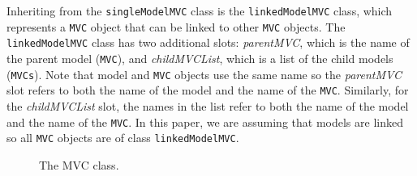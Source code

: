 \documentclass{article}[11pt]
\newcommand{\Robject}[1]{{\texttt{#1}}}
\newcommand{\Rslot}[1]{\textsl{#1}}
\newcommand{\Rclass}[1]{\texttt{#1}}
\begin{document}
Inheriting from the \Rclass{singleModelMVC} class is the
\Rclass{linkedModelMVC} class, which represents a \Robject{MVC} object that
can be linked to other \Robject{MVC} objects.  The \Rclass{linkedModelMVC}
class has two additional slots: \Rslot{parentMVC}, which is the name of the
parent model (\Robject{MVC}), and \Rslot{childMVCList}, which is a list of the
child models (\Robject{MVCs}).  Note that model and
\Robject{MVC} objects use the same name so the \Rslot{parentMVC} slot refers
to both the name of the model and the name of the \Robject{MVC}.
Similarly, for the \Rslot{childMVCList} slot, the names in the list refer to
both the name of the model and the name of the \Robject{MVC}.  In this paper,
we are assuming that models are linked so all \Robject{MVC} objects are of
class \Rclass{linkedModelMVC}.

\begin{figure}[ht]
  \begin{center}
    \caption{ The MVC class. }
    \label{Fig:MVCClass}
  \end{center}
\end{figure}
\end{document}

